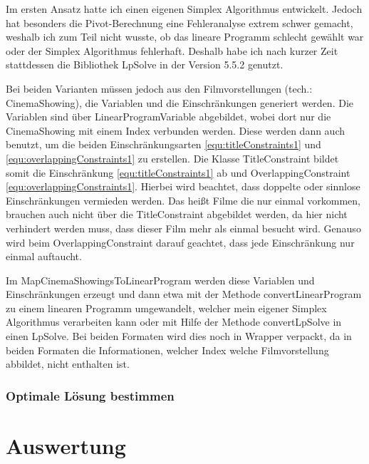 \documentclass[a4paper, 12pt]{article}
\begin{document}
Im ersten Ansatz hatte ich einen eigenen Simplex Algorithmus entwickelt.
Jedoch hat besonders die Pivot-Berechnung eine Fehleranalyse extrem schwer gemacht, weshalb ich zum Teil nicht wusste, ob das lineare Programm schlecht gewählt war oder der Simplex Algorithmus fehlerhaft.
Deshalb habe ich nach kurzer Zeit stattdessen die Bibliothek LpSolve in der Version 5.5.2 genutzt.

Bei beiden Varianten müssen jedoch aus den Filmvorstellungen (tech.: CinemaShowing), die Variablen und die Einschränkungen generiert werden.
Die Variablen sind über LinearProgramVariable abgebildet, wobei dort nur die CinemaShowing mit einem Index verbunden werden.
Diese werden dann auch benutzt, um die beiden Einschränkungsarten \eqref{equ:titleConstraints1} und \eqref{equ:overlappingConstraints1} zu erstellen.
Die Klasse TitleConstraint bildet somit die Einschränkung \eqref{equ:titleConstraints1} ab und OverlappingConstraint \eqref{equ:overlappingConstraints1}.
Hierbei wird beachtet, dass doppelte oder sinnlose Einschränkungen vermieden werden.
Das heißt Filme die nur einmal vorkommen, brauchen auch nicht über die TitleConstraint abgebildet werden, da hier nicht verhindert werden muss, dass dieser Film mehr als einmal besucht wird.
Genauso wird beim OverlappingConstraint darauf geachtet, dass jede Einschränkung nur einmal auftaucht.

Im MapCinemaShowingsToLinearProgram werden diese Variablen und Einschränkungen erzeugt und dann etwa mit der Methode convertLinearProgram zu einem linearen Programm umgewandelt, welcher mein eigener Simplex Algorithmus verarbeiten kann oder mit Hilfe der Methode convertLpSolve in einen LpSolve.
Bei beiden Formaten wird dies noch in Wrapper verpackt, da in beiden Formaten die Informationen, welcher Index welche Filmvorstellung abbildet, nicht enthalten ist.

\subsubsection{Optimale Lösung bestimmen}

\section{Auswertung}
\end{document}
